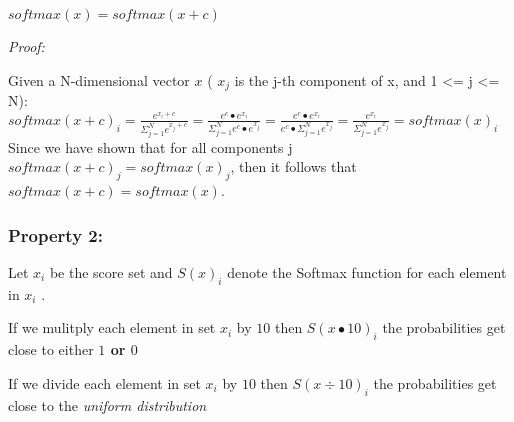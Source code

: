 \documentclass[12pt]{article}
\begin{document}
\begin{center}
	$softmax(x) = softmax(x + c)$
\end{center}

\textit{Proof:}

Given a N-dimensional vector $x$ ( $x_{j}$ is the j-th component of x, and 1 <= j <= N):\\

$softmax(x+c)_{i} = \frac{e^{x_{i} + c  }} {\Sigma _{j=1}^Ne^{x_{j} + c} } =  \frac{e^{c} \bullet e^{x_{i}}} {\Sigma _{j=1}^N e^{c} \bullet e^{x_{j}} } =  \frac{e^{c} \bullet e^{x_{i}}} {e^{c} \bullet \Sigma _{j=1}^N  e^{x_{j}} } = \frac{e^{x_{i}}} {\Sigma _{j=1}^Ne^{x_{j}} } = softmax(x)_{i}  $ \\


Since we have shown that for all components j $softmax(x+c)_{j} = softmax(x)_{j}$, then it follows that $softmax(x+c) = softmax(x)$.

\subsubsection{Property 2:}  Let $x_{i}$ be  the score set  and $S(x)_{i}$ denote the Softmax function for each element in $x_{i}$ . 
\begin{flushleft}
	If we mulitply each element in set $x_{i}$ by $10$ then  $S(x \bullet 10)_{i}$ the probabilities get close to either \textbf{$1$ or $0$} \\
\end{flushleft}
\begin{flushleft}
	If we divide  each element in set $x_{i}$ by $10$ then  $S( {x \div 10})_{i}$  the probabilities get close to the \textit{uniform distribution }\\
\end{flushleft}
 
\end{document}
